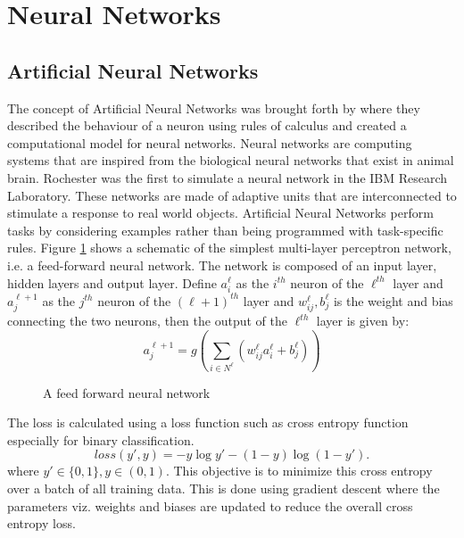 \documentclass[fleqn,usenatbib]{mnras}
\begin{document}
\section{Neural Networks}
\subsection{Artificial Neural Networks}
\hspace{0.25 in}The concept of Artificial Neural Networks was brought forth by \citet{mcculloch1943logical} where they described the behaviour of a neuron using rules of calculus and created a computational model for neural networks. Neural networks are computing systems that are inspired from the biological neural networks that exist in animal brain. Rochester was the first to simulate a neural network in the IBM Research Laboratory. These networks are made of adaptive units that are interconnected to stimulate a response to real world objects. Artificial Neural Networks perform tasks by considering examples rather than being programmed with task-specific rules. Figure \ref{fig: ANN} shows a schematic of the simplest multi-layer perceptron network, i.e. a feed-forward neural network. The network is composed of an input layer, hidden layers and output layer. Define $a_i^\ell$ as the $i^{th}$ neuron of the $\ell^{th}$ layer and $a_j^{\ell+1}$ as the $j^{th}$ neuron of the $(\ell+1)^{th}$ layer and $w_{ij}^\ell, b_j^\ell$ is the weight and bias connecting the two neurons, then the output of the $\ell^{th}$ layer is given by:
\begin{equation}
    a^{\ell+1}_j = g(\sum_{i \in N^\ell}(w_{ij}^{\ell}a_i^{\ell} + b_j^{\ell}))
    \label{ANN_activation}
\end{equation}

\begin{figure}
    \centering
    
    \caption{A feed forward neural network}
    \label{fig: ANN}
\end{figure}
The loss is calculated using a loss function such as cross entropy function especially for binary classification.
\begin{equation}
    loss(y',y) = -y\log{y'} - (1-y)\log{(1-y')}.
    \label{ANN_loss}
\end{equation}
where $y' \in \{0,1\}, y \in (0,1)$. This objective is to minimize this cross entropy over a batch of all training data. This is done using gradient descent where the parameters viz. weights and biases are updated to reduce the overall cross entropy loss.
\end{document}

